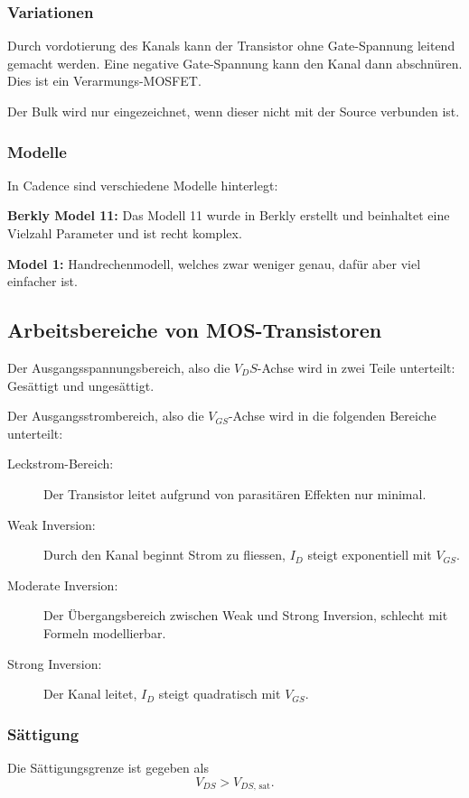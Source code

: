 \subsubsection{Variationen}
Durch vordotierung des Kanals kann der Transistor ohne Gate-Spannung leitend gemacht werden.
Eine negative Gate-Spannung kann den Kanal dann abschnüren.
Dies ist ein Verarmungs-MOSFET.


Der Bulk wird nur eingezeichnet, wenn dieser nicht mit der Source verbunden ist.

\subsubsection{Modelle}
In Cadence sind verschiedene Modelle hinterlegt:

\textbf{Berkly Model 11:} Das Modell 11 wurde in Berkly erstellt und beinhaltet eine Vielzahl Parameter und ist recht komplex.

\textbf{Model 1:} Handrechenmodell, welches zwar weniger genau, dafür aber viel einfacher ist.

\subsection{Arbeitsbereiche von MOS-Transistoren}
Der Ausgangsspannungsbereich, also die $V_DS$-Achse wird in zwei Teile unterteilt: Gesättigt und ungesättigt.

Der Ausgangsstrombereich, also die $V_{GS}$-Achse wird in die folgenden Bereiche unterteilt:
\begin{description}
    \item[Leckstrom-Bereich:] Der Transistor leitet aufgrund von parasitären Effekten nur minimal.
    \item[Weak Inversion:] Durch den Kanal beginnt Strom zu fliessen, $I_D$ steigt exponentiell mit $V_{GS}$.
    \item[Moderate Inversion:] Der Übergangsbereich zwischen Weak und Strong Inversion, schlecht mit Formeln modellierbar.
    \item[Strong Inversion:] Der Kanal leitet, $I_D$ steigt quadratisch mit $V_{GS}$.
\end{description}

\subsubsection{Sättigung}
Die Sättigungsgrenze ist gegeben als
\[\boxed{V_{DS} > V_{DS\text{, sat}}}.\]

